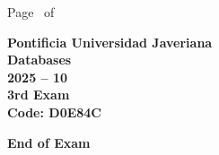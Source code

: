 \documentclass[11pt, addpoints]{exam}\usepackage[utf8]{inputenc}
\begin{document}
\begin{coverpages}
\begin{center}
			\vspace{3mm}
			\leavevmode \hspace{5mm} 
		\end{center}
	\end{coverpages}

	\footer{} {Page \thepage\ of \numpages} {}

	\centering
	\textbf{\Large Pontificia Universidad Javeriana}\\
	\textbf{\Large Databases} \\
	\textbf{\large 2025 -- 10} \\
	\textbf{\large 3rd Exam} \\
	\textbf{Code: D0E84C}


	\begin{questions}
		
		
		
		
		
		
		
		
		
		
		
		
		
		
		
		
		
		
		
		
	\end{questions}

	\vspace{5mm}
	\noindent \textbf{End of Exam}
\end{document}
